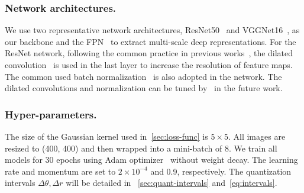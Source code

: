 \documentclass[10pt,journal,cspaper,compsoc]{IEEEtran}
\begin{document}
\subsubsection{Network architectures.}
We use two representative network architectures,
ResNet50~\cite{he2016deep} and VGGNet16~\cite{simonyan2014very}, as our backbone
and the FPN~\cite{lin2017feature} to extract multi-scale deep representations.
For the ResNet network, following the common practice in previous works~\cite{zhao2017pyramid,chen2018encoder,pami20Res2net},
the dilated convolution~\cite{yu2015multi} is used in the last layer to increase the resolution of feature maps. The common used batch normalization~\cite{ioffe2015batch} is also adopted in the network. 
The dilated convolutions and normalization can be tuned by~\cite{gao2021rbn,gao2021global2local} in the future work.


\subsubsection{Hyper-parameters.}
The size of the Gaussian kernel used in~\cref{sec:loss-func} is $5\times5$. 
All images are resized to (400, 400) and then wrapped into a mini-batch of 8.
We train all models for 30 epochs using Adam optimizer~\cite{kingma2014adam} without weight decay.
The learning rate and momentum are set to $2 \times 10^{-4}$ and 0.9, respectively.
The quantization intervals $\Delta\theta, \Delta r$ will be detailed in
~\cref{sec:quant-intervals} and~\cref{eq:intervals}.
\end{document}
